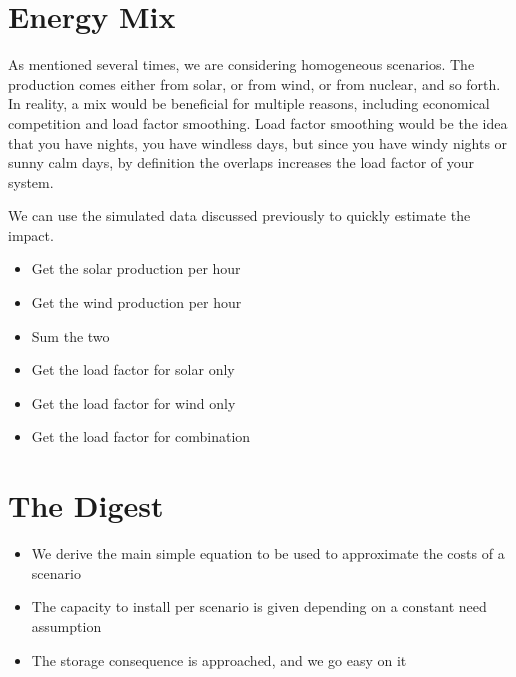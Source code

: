 \section{Energy Mix}

As mentioned several times, we are considering homogeneous scenarios. The production comes either from solar, or from wind, or from nuclear, and so forth. In reality, a mix would be beneficial for multiple reasons, including economical competition and load factor smoothing. Load factor smoothing would be the idea that you have nights, you have windless days, but since you have windy nights or sunny calm days, by definition the overlaps increases the load factor of your system.

We can use the simulated data discussed previously to quickly estimate the impact.

\begin{itemize}
\item Get the solar production per hour
\item Get the wind production per hour
\item Sum the two
\item Get the load factor for solar only
\item Get the load factor for wind only
\item Get the load factor for combination
\end{itemize}



\section{The Digest}


\begin{kaoboxgreen}[frametitle=Main Takeaways]

\begin{itemize}
\item We derive the main simple equation to be used to approximate the costs of a scenario
\item The capacity to install per scenario is given depending on a constant need assumption
\item The storage consequence is approached, and we go easy on it
\end{itemize}
  
\end{kaoboxgreen}